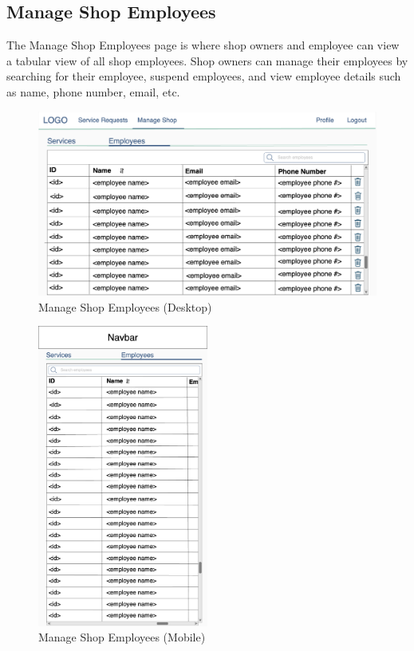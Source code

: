 \documentclass[12pt, titlepage]{article}
\begin{document}
\subsection{Manage Shop Employees}
The Manage Shop Employees page is where shop owners and employee can view a tabular view of all shop employees. Shop owners can manage their employees by searching for their
employee, suspend employees, and view employee details such as name, phone number, email, etc.

\begin{figure}[H]
	\centering
	\includegraphics[width=\textwidth]{mockups/Manage Shop (Employees) (Desktop).png}
	\caption{Manage Shop \textemdash{} Employees (Desktop)}
\end{figure}

\begin{figure}[H]
	\centering
	\includegraphics[width=0.5\textwidth]{mockups/Manage Shop (Employees) (Mobile).png}
	\caption{Manage Shop \textemdash{} Employees (Mobile)}
\end{figure}
\end{document}
